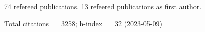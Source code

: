 74 refereed publications. 13 refeered publications as first author.

Total citations~=~3258; h-index~=~32 (2023-05-09)